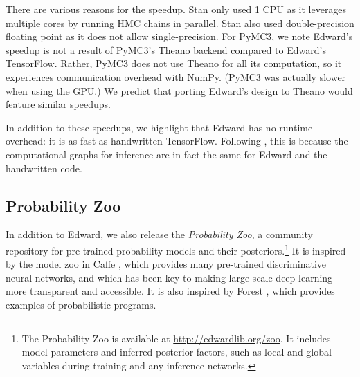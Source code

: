 There are various reasons for the speedup. Stan only used 1
CPU as it leverages multiple cores by running \gls{HMC} chains in
parallel. Stan also used double-precision floating point as it
does not allow single-precision. For PyMC3, we note Edward's speedup is
not a result of PyMC3's Theano backend compared to Edward's
TensorFlow. Rather, PyMC3 does not use Theano for all its
computation, so it experiences communication overhead with NumPy.
(PyMC3 was actually slower when using the GPU.)
We predict that porting Edward's design to Theano would feature
similar speedups.

In addition to these speedups, we highlight that Edward has no runtime
overhead: it is as fast as handwritten TensorFlow.  Following
, this is because the computational graphs for
inference are in fact the same for Edward and the handwritten code.

\subsection{Probability Zoo}

In addition to Edward, we also release the \emph{Probability Zoo}, a
community repository for pre-trained probability models and their
posteriors.\footnote{%
  The Probability Zoo is available at \url{http://edwardlib.org/zoo}.
  It includes model parameters and inferred posterior factors, such as
  local and global variables during training and any inference
  networks.  } It is inspired by the model zoo in Caffe
\citep{jia2014caffe}, which provides many pre-trained discriminative
neural networks, and which has been key to making large-scale deep learning
more transparent and accessible. It is also inspired by Forest
\citep{stuhlmueller2012forest}, which provides examples of
probabilistic programs.

